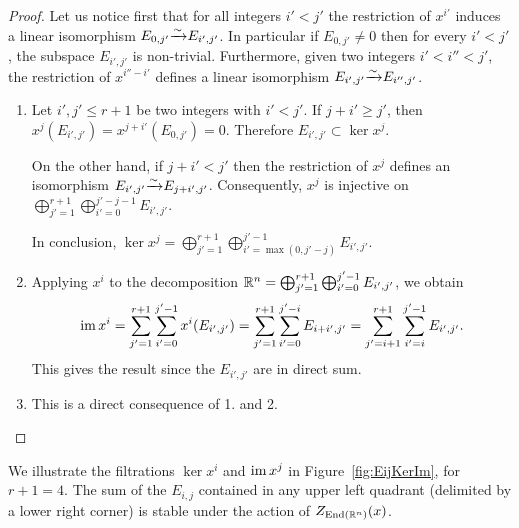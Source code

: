 \documentclass[english]{article}
\begin{document}
\begin{proof}
    Let us notice first that for all integers $i'<j'$ the restriction of $x^{i'}$ induces a linear isomorphism $E_{0,j'} {\xrightarrow{\sim}} E_{i',j'}$. In particular if $E_{0,j'}\neq 0$ then for every $i'<j'$, the subspace $E_{i',j'}$ is non-trivial.
    Furthermore, given two integers $i'<i''<j'$, the restriction of $x^{i''-i'}$ defines a linear isomorphism $E_{i',j'}{\xrightarrow{\sim}} E_{i'', j'}$.
    \begin{enumerate}
        \item Let $i', j' \leqslant r+1$ be two integers with $i'<j'$.
        If $j+i' \geqslant j'$, then $x^j(E_{i',j'}) = x^{j+i'} (E_{0,j'})=0$. Therefore $E_{i',j'}\subset \ker x^j$.

        On the other hand, if $j+i' < j'$ then the restriction of $x^{j}$ defines an isomorphism $E_{i',j'}{\xrightarrow{\sim}} E_{j+i', j'}$. Consequently, $x^j$ is injective on 
        $\bigoplus_{j'=1}^{r+1} \bigoplus_{i'=0}^{j'-j-1} E_{i',j'}$.

        In conclusion, 
        $\ker x^j = 
            \bigoplus_{j'=1}^{r+1}
            \bigoplus_{i'=\max(0, j'-j)}^{j'-1}
                E_{i',j'}$.
%
        \item Applying $x^i$ to the decomposition 
        $\mathbb{R}^n = \bigoplus_{j'=1}^{r+1} \bigoplus_{i'=0}^{j'-1} E_{i',j'}$, we obtain
        \[
            \operatorname{im} x^i = 
            \sum_{j'=1}^{r+1} \sum_{i'=0}^{j'-1}
            x^i(E_{i',j'})
            = \sum_{j'=1}^{r+1} \sum_{i'=0}^{j'-i}
            E_{i+i', j'}
            = \sum_{j'=i+1}^{r+1} \sum_{i'=i}^{j'-1}
            E_{i',j'}
        .\]
        This gives the result since the $E_{i',j'}$ are in direct sum.

        \item This is a direct consequence of 1. and 2.
    \end{enumerate}
\end{proof}

We illustrate the filtrations $\ker x^i$ and $\operatorname{im} x^j$ in Figure~\ref{fig:EijKerIm}, for $r+1=4$. The sum of the $E_{i,j}$ contained in any upper left quadrant (delimited by a lower right corner) is stable under the action of $Z_{\operatorname{End}(\mathbb{R}^n)}(x)$.
\end{document}
